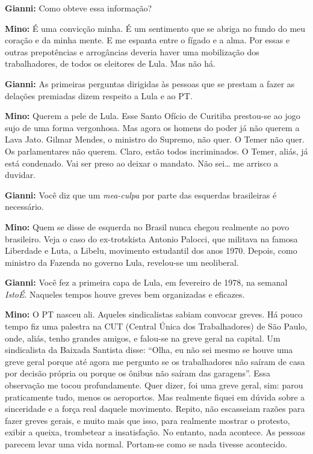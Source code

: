 \textbf{Gianni:} Como obteve essa informação?

\textbf{Mino:} É uma convicção minha. É um sentimento que se abriga no
fundo do meu coração e da minha mente. E me espanta entre o fígado e a
alma. Por essas e outras prepotências e arrogâncias deveria haver uma
mobilização dos trabalhadores, de todos os eleitores de Lula. Mas não
há.

\textbf{Gianni:} As primeiras perguntas dirigidas às pessoas que se
prestam a fazer as delações premiadas dizem respeito a Lula e ao PT.

\textbf{Mino:} Querem a pele de Lula. Esse Santo Ofício de Curitiba
prestou-se ao jogo sujo de uma forma vergonhosa. Mas agora os homens do
poder já não querem a Lava Jato. Gilmar Mendes, o ministro do Supremo,
não quer. O Temer não quer. Os parlamentares não querem. Claro, estão
todos incriminados. O Temer, aliás, já está condenado. Vai ser preso ao
deixar o mandato. Não sei\ldots{} me arrisco a duvidar.

\textbf{Gianni:} Você diz que um \emph{mea-culpa} por parte das
esquerdas brasileiras é necessário.

\textbf{Mino:} Quem se disse de esquerda no Brasil nunca chegou
realmente ao povo brasileiro. Veja o caso do ex-trotskista Antonio
Palocci, que militava na famosa Liberdade e Luta, a Libelu, movimento
estudantil dos anos 1970. Depois, como ministro da Fazenda no governo
Lula, revelou-se um neoliberal.

\textbf{Gianni:} Você fez a primeira capa de Lula, em fevereiro de 1978,
na semanal \emph{IstoÉ}. Naqueles tempos houve greves bem organizadas e
eficazes.

\textbf{Mino:} O PT nasceu ali. Aqueles sindicalistas sabiam convocar
greves. Há pouco tempo fiz uma palestra na CUT (Central Única dos
Trabalhadores) de São Paulo, onde, aliás, tenho grandes amigos, e
falou-se na greve geral na capital. Um sindicalista da Baixada Santista
disse: ``Olha, eu não sei mesmo se houve uma greve geral porque até
agora me pergunto se os trabalhadores não saíram de casa por decisão
própria ou porque os ônibus não saíram das garagens''. Essa observação
me tocou profundamente. Quer dizer, foi uma greve geral, sim: parou
praticamente tudo, menos os aeroportos. Mas realmente fiquei em dúvida
sobre a sinceridade e a força real daquele movimento. Repito, não
escasseiam razões para fazer greves gerais, e muito mais que isso, para
realmente mostrar o protesto, exibir a queixa, trombetear a
insatisfação. No entanto, nada acontece. As pessoas parecem levar uma
vida normal. Portam-se como se nada tivesse acontecido.

